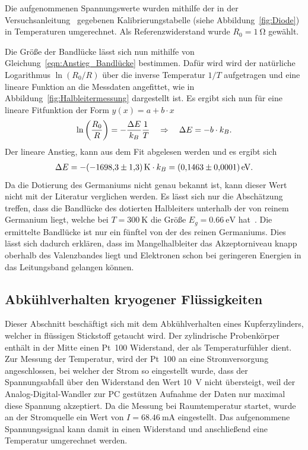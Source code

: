\documentclass[parskip=half, a4paper,twoside,final]{article}
\begin{document}
Die aufgenommenen Spannungswerte wurden mithilfe der in der Versuchsanleitung~\cite{Thurk} gegebenen Kalibrierungstabelle (siehe Abbildung~\ref{fig:Diode}) in Temperaturen umgerechnet. Als Referenzwiderstand wurde $R_0 = \SI{1}{\ohm}$ gewählt.



Die Größe der Bandlücke lässt sich nun mithilfe von Gleichung~\eqref{eqn:Anstieg_Bandlücke} bestimmen. Dafür wird wird der natürliche Logarithmus $\ln(R_0/R)$ über die inverse Temperatur $1/T$ aufgetragen und eine lineare Funktion an die Messdaten angefittet, wie in Abbildung~\ref{fig:Halbleitermessung} dargestellt ist. Es ergibt sich nun für eine lineare Fitfunktion der Form $y(x) = a + b\cdot x$
\begin{align}
  \ln\qty(\frac{R_0}{R}) = - \frac{\Delta E}{k_B}\frac{1}{T} \quad \Rightarrow \quad \Delta E = - b \cdot k_B.
\end{align}
Der lineare Anstieg, kann aus dem Fit abgelesen werden und es ergibt sich
\begin{align}
  \Delta E = -\SI{-1698.3\pm 1.3}{\kelvin} \cdot k_B = \SI{0.1463\pm0.0001}{\electronvolt}.
\end{align}
Da die Dotierung des Germaniums nicht genau bekannt ist, kann dieser Wert nicht mit der Literatur verglichen werden. Es lässt sich nur die Abschätzung treffen, dass die Bandlücke des dotierten Halbleiters unterhalb der von reinem Germanium liegt, welche bei $T=\SI{300}{\kelvin}$ die Größe $E_g = \SI{0.66}{\electronvolt}$ hat~\cite{Hunklinger}. Die ermittelte Bandlücke ist nur ein fünftel von der des reinen Germaniums. Dies lässt sich dadurch erklären, dass im Mangelhalbleiter das Akzeptorniveau knapp oberhalb des Valenzbandes liegt und Elektronen schon bei geringeren Energien in das Leitungsband gelangen können.

\subsection{Abkühlverhalten kryogener Flüssigkeiten}

Dieser Abschnitt beschäftigt sich mit dem Abkühlverhalten eines Kupferzylinders, welcher in flüssigen Stickstoff getaucht wird. Der zylindrische Probenkörper enthält in der Mitte einen Pt~100 Widerstand, der als Temperaturfühler dient. Zur Messung der Temperatur, wird der Pt~100 an eine Stromversorgung angeschlossen, bei welcher der Strom so eingestellt wurde, dass der Spannungsabfall über den Widerstand den Wert \SI{10}{\volt} nicht übersteigt, weil der Analog-Digital-Wandler zur PC gestützen Aufnahme der Daten nur maximal diese Spannung akzeptiert. Da die Messung bei Raumtemperatur startet, wurde an der Stromquelle ein Wert von $I = \SI{68.46}{\milli\ampere}$ eingestellt. Das aufgenommene Spannungssignal kann damit in einen Widerstand und anschließend eine Temperatur umgerechnet werden.
\end{document}
